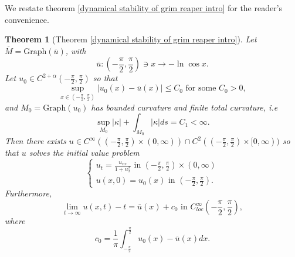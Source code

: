 \documentclass[pdflatex,sn-mathphys-num]{sn-jnl}%
\newtheorem{theorem}{Theorem}[section]
\begin{document}
We restate theorem \ref{dynamical stability of grim reaper intro} for the reader's convenience. 
\begin{theorem}[Theorem \ref{dynamical stability of grim reaper intro}]\label{dynamical stability of grim reaper}
Let $\overline{M} = \text{Graph}(\overline{u})$, with \begin{equation}
    \overline{u} : (-\frac{\pi}{2}, \frac{\pi}{2}) \ni x \to -\ln\cos x.
\end{equation}
Let $u_0 \in C^{2+ \alpha}(-\frac{\pi}{2}, \frac{\pi}{2})$ so that 
\begin{equation}\label{c0 closeness 1d}
    \sup_{x\in (-\frac{\pi}{2}, \frac{\pi}{2})}|u_0(x) - \overline{u}(x)| \leq C_0 \text{ for some }C_0 > 0,
\end{equation}
and $M_0 = \text{Graph}(u_0)$ has bounded curvature and finite total curvature, i.e
\begin{equation}\label{Finite total curvature}
    \sup_{M_0}|\kappa| + \int_{M_0}|\kappa|ds  = C_1 < \infty.
\end{equation}
Then there exists $u \in C^{\infty}((-\frac{\pi}{2}, \frac{\pi}{2})\times (0, \infty))\cap C^2((-\frac{\pi}{2}, \frac{\pi}{2})\times [0, \infty))$ so that $u$ solves the initial value problem
\begin{equation}
    \begin{cases}
        u_t = \frac{u_{xx}}{1 + u_x^2} \text{ in }(-\frac{\pi}{2},\frac{\pi}{2}) \times (0, \infty) \\ 
        u(x,0) = u_0(x) \text{ in }(-\frac{\pi}{2}, \frac{\pi}{2}).
    \end{cases}
\end{equation}
Furthermore,
\begin{equation}
    \lim_{t \to \infty}u(x,t) - t = \overline{u}(x) + c_0 \text{ in }C^{\infty}_{loc}(-\frac{\pi}{2}, \frac{\pi}{2}),
\end{equation}
where 
\begin{equation}
    c_0 = \frac{1}{\pi}\int_{-\frac{\pi}{2}}^{\frac{\pi}{2}}u_0(x) - \overline{u}(x)dx.
\end{equation}
\end{theorem}
\end{document}

